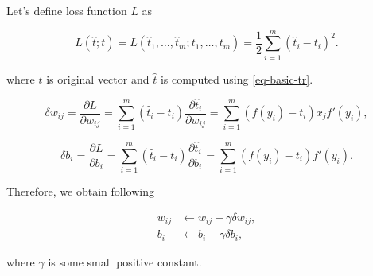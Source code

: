\documentclass{article}
\numberwithin{equation}{section}
\theoremstyle{definition}
\theoremstyle{remark}
\begin{document}
Let's define loss function $L$ as

\begin{equation}\label{eq-basic-loss}
    L(\hat{t};t) = L(\hat{t}_1,\dots,\hat{t}_m;t_1,\dots,t_m) = \frac{1}{2}\sum_{i=1}^{m} \left( \hat{t}_i - t_i \right)^2.
\end{equation}

where $t$ is original vector and $\hat{t}$ is computed using \eqref{eq-basic-tr}.

\[
    \delta w_{ij} =  \frac{\partial L}{\partial w_{ij}} = 
    \sum_{i=1}^{m} \left( \hat{t}_i - t_i \right) \frac{\partial \hat{t}_{i}}{\partial w_{ij}} =
    \sum_{i=1}^{m} \left( f(y_{i}) - t_i \right)  x_{j} f'(y_{i}) ,
\]

\[
    \delta b_{i} =\frac{\partial L}{\partial b_{i}} = \sum_{i=1}^{m} \left( \hat{t}_i - t_i \right) \frac{\partial \hat{t}_{i}}{\partial b_{i}} =
     \sum_{i=1}^{m} \left( f(y_{i}) - t_i \right) f'(y_{i}).
\]

Therefore, we obtain following

\begin{align}
    w_{ij} &\leftarrow w_{ij} - \gamma \delta w_{ij}, \\
    b_{i} & \leftarrow b_{i} - \gamma \delta b_{i},
\end{align}

where $\gamma$ is some small positive constant.
\end{document}
